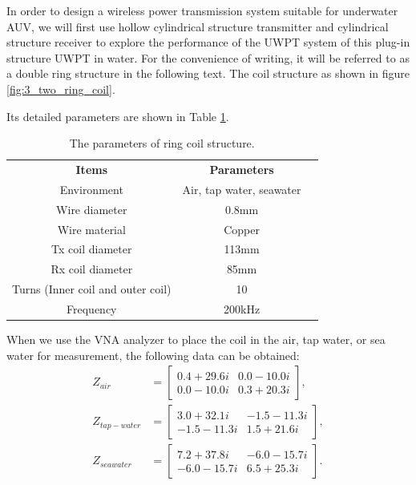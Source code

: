 In order to design a wireless power transmission system suitable for underwater AUV, we will first use hollow cylindrical structure transmitter and cylindrical structure receiver to explore the performance of the UWPT system of this plug-in structure UWPT in water. For the convenience of writing, it will be referred to as a double ring structure in the following text. The coil structure as shown in figure \ref{fig:3_two_ring_coil}.

Its detailed parameters are shown in Table \ref{table:ring coil parameters}.

\begin{table}[htbp]
    \centering
    \caption{The parameters of ring coil structure.}
    \begin{tabular}{ c|cc }
        \thickhline
        \textbf{Items}                    & \textbf{Parameters}      \\
        \thickhline
        Environment                       & Air, tap water, seawater \\ \hline
        Wire diameter                     & 0.8mm                    \\ \hline
        Wire material                     & Copper                   \\
        \hline
        Tx coil diameter                  & 113mm                    \\ \hline
        Rx coil diameter                  & 85mm                     \\ \hline
        Turns (Inner coil and outer coil) & 10                       \\ \hline
        Frequency                         & 200kHz                   \\ \hline
    \end{tabular}
    \label{table:ring coil parameters}
\end{table}

When we use the VNA analyzer to place the coil in the air, tap water, or sea water for measurement, the following data can be obtained:
\begin{equation*}
    \begin{aligned}
        Z_{air}       & =
        \begin{bmatrix}
            0.4 +29.6i & 0.0 -10.0i \\
            0.0 -10.0i & 0.3 +20.3i
        \end{bmatrix}, \\
        Z_{tap-water} & =
        \begin{bmatrix}
            3.0 +32.1i  & -1.5 -11.3i \\
            -1.5 -11.3i & 1.5 +21.6i
        \end{bmatrix}, \\
        Z_{seawater}  & =
        \begin{bmatrix}
            7.2 +37.8i  & -6.0 -15.7i \\
            -6.0 -15.7i & 6.5 +25.3i
        \end{bmatrix}.
    \end{aligned}
\end{equation*}

